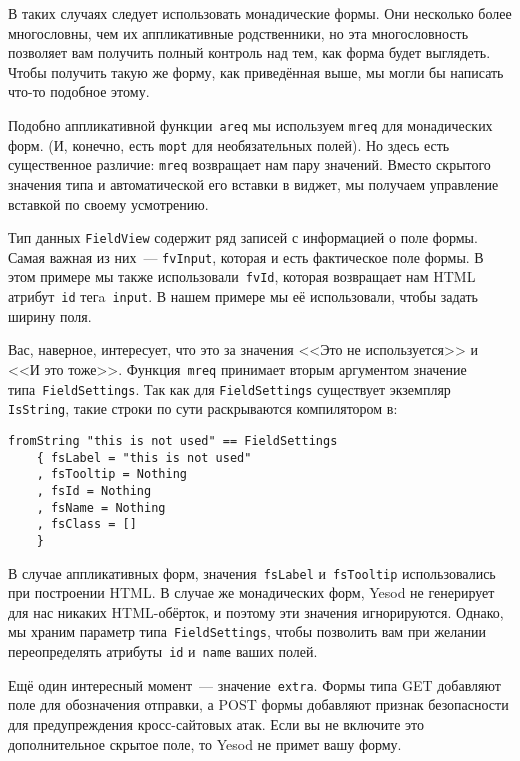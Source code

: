 В таких случаях следует использовать монадические формы. Они несколько более
многословны, чем их аппликативные родственники, но эта многословность
позволяет вам получить полный контроль над тем, как форма будет выглядеть.
Чтобы получить такую же форму, как приведённая выше, мы могли бы написать
что-то подобное этому.


Подобно аппликативной функции~\lstinline'areq' мы используем \lstinline'mreq'
для монадических форм.  (И, конечно, есть \lstinline'mopt' для необязательных
полей).  Но здесь есть существенное различие: \lstinline'mreq' возвращает нам
пару значений.  Вместо скрытого значения типа
и автоматической его вставки в виджет, мы получаем управление вставкой по
своему усмотрению.

Тип данных \lstinline'FieldView' содержит ряд записей с информацией о поле
формы. Самая важная из них~--- \lstinline'fvInput', которая и есть фактическое
поле формы. В этом примере мы также использовали~\lstinline'fvId', которая
возвращает нам HTML атрибут~\texttt{id} тегa~\texttt{input}. В нашем примере
мы её использовали, чтобы задать ширину поля.

Вас, наверное, интересует, что это за значения <<Это не используется>> и <<И это
тоже>>.  Функция~\lstinline'mreq' принимает вторым аргументом значение
типа~\lstinline'FieldSettings'.  Так как для \lstinline'FieldSettings'
существует экземпляр \lstinline'IsString', такие строки по сути раскрываются
компилятором в:

\begin{lstlisting}
fromString "this is not used" == FieldSettings
    { fsLabel = "this is not used"
    , fsTooltip = Nothing
    , fsId = Nothing
    , fsName = Nothing
    , fsClass = []
    }
\end{lstlisting}

В случае аппликативных форм, значения~\lstinline'fsLabel'
и~\lstinline'fsTooltip' использовались при построении HTML. В случае же
монадических форм, Yesod не генерирует для нас никаких HTML-обёрток, и поэтому
эти значения игнорируются. Однако, мы храним параметр
типа~\lstinline'FieldSettings', чтобы позволить вам при желании переопределять
атрибуты~\texttt{id} и~\texttt{name} ваших полей.

Ещё один интересный момент~--- значение~\lstinline{extra}. Формы типа GET
добавляют поле для обозначения отправки, а POST формы добавляют признак
безопасности для предупреждения кросс-сайтовых атак.  Если вы не включите это
дополнительное скрытое поле, то Yesod не примет вашу форму.

